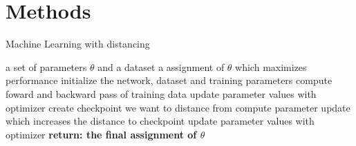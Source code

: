 \documentclass[
a4paper, 12pt, %
titlepage, 		 %
twoside,			 %
headsepline,	 %
BCOR5mm,			 %
idxtotoc, bibtotoc]{scrreprt}	%
\begin{document}
\begin{figure}[h]\label{fig:Scheduler_lr}
    \begin{center}
    \end{center}
\end{figure}


\section{Methods}
\begin{algorithm}\label{alg:Distance_Motivation}
    \begin{algorithmic}[1]
        \caption{Machine Learning with distancing}
        \REQUIRE a set of parameters $\theta$ and a dataset
        \ENSURE a assignment of $\theta$ which maximizes performance
        \STATE initialize the network, dataset and training parameters
            \STATE compute foward and backward pass of training data
            \STATE update parameter values with optimizer
        \ENDFOR
        \STATE create checkpoint we want to distance from
			\STATE compute parameter update which increases the distance to checkpoint
			\ENDFOR
		\STATE update parameter values with optimizer
        \ENDFOR
        \STATE \textbf{return: the final assignment of $\theta$}
    \end{algorithmic}
\end{algorithm}
\end{document}
